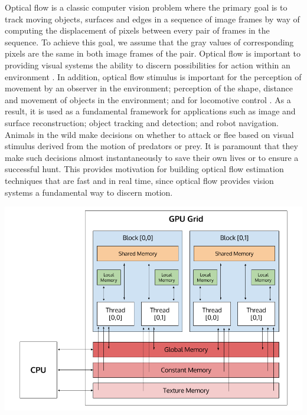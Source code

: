 \documentclass[english]{article}
\begin{document}
	Optical flow is a classic computer vision problem where the primary goal is to track moving objects, surfaces and edges in a sequence of image frames by way of computing the displacement of pixels between every pair of frames in the sequence. To achieve this goal, we assume that the gray values of corresponding pixels are the same in both image frames of the pair. Optical flow is important to providing visual systems the ability to discern possibilities for action within an environment \cite{8}. In addition, optical flow stimulus is important for the perception of movement by an observer in the environment; perception of the shape, distance and movement of objects in the environment; and for locomotive control \cite{9}. As a result, it is used as a fundamental framework for applications such as image and surface reconstruction; object tracking and detection; and robot navigation. Animals in the wild make decisions on whether to attack or flee based on visual stimulus derived from the motion of predators or prey. It is paramount that they make such decisions almost instantaneously to save their own lives or to ensure a successful hunt. This provides motivation for building optical flow estimation techniques that are fast and in real time, since optical flow provides vision systems a fundamental way to discern motion.

	\begin{center}
	\includegraphics[width=160mm]{results/images/1_gpu_grid.png}
	\end{center}
\end{document}
